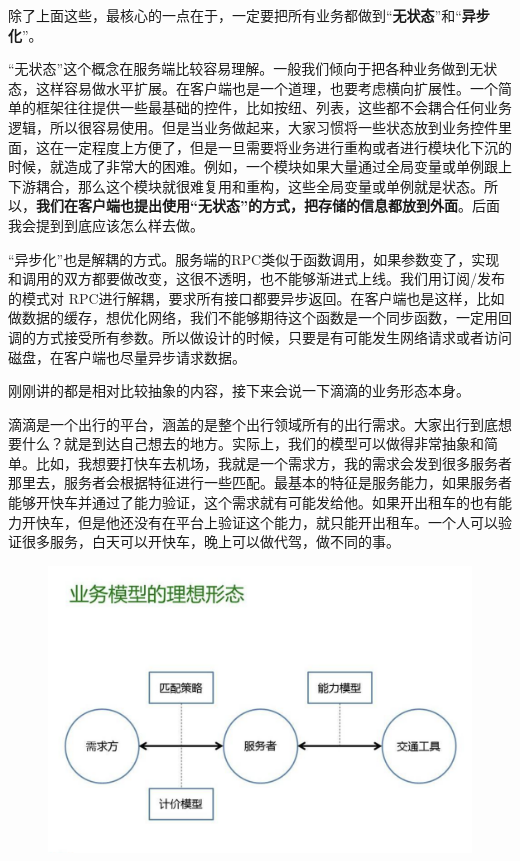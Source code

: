 \documentclass[12pt]{article}
\begin{document}
除了上面这些，最核心的一点在于，一定要把所有业务都做到“\textbf{无状态}”和“\textbf{异步化}”。

“无状态”这个概念在服务端比较容易理解。一般我们倾向于把各种业务做到无状态，这样容易做水平扩展。在客户端也是一个道理，也要考虑横向扩展性。一个简单的框架往往提供一些最基础的控件，比如按纽、列表，这些都不会耦合任何业务逻辑，所以很容易使用。但是当业务做起来，大家习惯将一些状态放到业务控件里面，这在一定程度上方便了，但是一旦需要将业务进行重构或者进行模块化下沉的时候，就造成了非常大的困难。例如，一个模块如果大量通过全局变量或单例跟上下游耦合，那么这个模块就很难复用和重构，这些全局变量或单例就是状态。所以，\textbf{我们在客户端也提出使用“无状态”的方式，把存储的信息都放到外面}。后面我会提到到底应该怎么样去做。

“异步化”也是解耦的方式。服务端的RPC类似于函数调用，如果参数变了，实现和调用的双方都要做改变，这很不透明，也不能够渐进式上线。我们用订阅/发布的模式对 RPC进行解耦，要求所有接口都要异步返回。在客户端也是这样，比如做数据的缓存，想优化网络，我们不能够期待这个函数是一个同步函数，一定用回调的方式接受所有参数。所以做设计的时候，只要是有可能发生网络请求或者访问磁盘，在客户端也尽量异步请求数据。

刚刚讲的都是相对比较抽象的内容，接下来会说一下滴滴的业务形态本身。

滴滴是一个出行的平台，涵盖的是整个出行领域所有的出行需求。大家出行到底想要什么？就是到达自己想去的地方。实际上，我们的模型可以做得非常抽象和简单。比如，我想要打快车去机场，我就是一个需求方，我的需求会发到很多服务者那里去，服务者会根据特征进行一些匹配。最基本的特征是服务能力，如果服务者能够开快车并通过了能力验证，这个需求就有可能发给他。如果开出租车的也有能力开快车，但是他还没有在平台上验证这个能力，就只能开出租车。一个人可以验证很多服务，白天可以开快车，晚上可以做代驾，做不同的事。

\begin{figure}[H]
    \centering
    \includegraphics[width=1\textwidth]{fig/DIDI_Reconstruction_11.png}
\end{figure}
\end{document}
